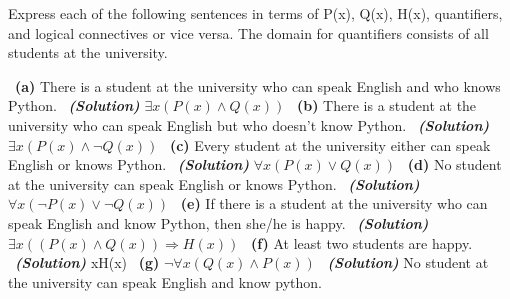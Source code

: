 \documentclass[a4 paper]{article}
\numberwithin{equation}{section}
\newcommand{\subproblem}[1]{~\newline\textbf{(#1)}}
\newcommand{\solution}{~\newline\textbf{\textit{(Solution)}} }
\newcommand{\0}{\mathbf{0}}
\begin{document}
Express each of the following sentences in terms of P(x), Q(x), H(x), quantifiers, and logical connectives or vice versa. The domain
for quantifiers consists of all students at the university.

\subproblem{a} There is a student at the university who can speak English and who knows Python.
\solution
\newline
{$\exists x (P(x) \wedge Q(x))$}
\subproblem{b} There is a student at the university who can speak English but who doesn’t know Python.
\solution
\newline
{$\exists x (P(x) \wedge \neg Q(x))$}
\subproblem{c} Every student at the university either can speak English or knows Python.
\solution
\newline
{$\forall x (P(x) \vee Q(x))$}
\subproblem{d} No student at the university can speak English or knows Python.
\solution
\newline
{$\forall x (\neg P(x) \vee \neg Q(x))$}
\subproblem{e} If there is a student at the university who can speak English and know Python, then she/he is happy.
\solution
\newline
{$\exists x ((P(x) \wedge Q(x)) \Rightarrow H(x))$}
\subproblem{f} At least two students are happy.
\solution
\newline
\exists xH(x)
\subproblem{g} $\neg \forall x (Q(x) \wedge P(x))$
\solution
\newline
{No student at the university can speak English and know python.}
\newline
\newline
\newline
\newline
\newline
\newline
\newline
\newline
\newline
\newline
\newline
\newline
\newline
\newline
\newline
\newline
\newline
\newline
\newline
\newline
\newline
\newline
\newline
\newline
\newline
\end{document}
